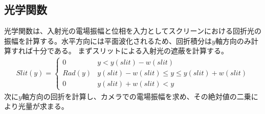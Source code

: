 \documentclass[a4paper,11pt,uplatex]{jsbook}
\begin{document}
\subsection{光学関数}
光学関数は、入射光の電場振幅と位相を入力としてスクリーンにおける回折光の振幅を計算する。水平方向には平面波化されるため、回折積分は$y$軸方向のみ計算すれば十分である。
まずスリットによる入射光の遮蔽を計算する。
\begin{align}
  Slit(y) = 
  \begin{cases}
    0       &  y  < y(slit) - w(slit)\\
    Rad(y)  &  y(slit) - w(slit) \leq y \leq y(slit) + w(slit)\\
    0       &  y(slit) + w(slit) < y
  \end{cases}
\end{align}
次に$y$軸方向の回折を計算し、カメラでの電場振幅を求め、その絶対値の二乗により光量が求まる。
\end{document}
